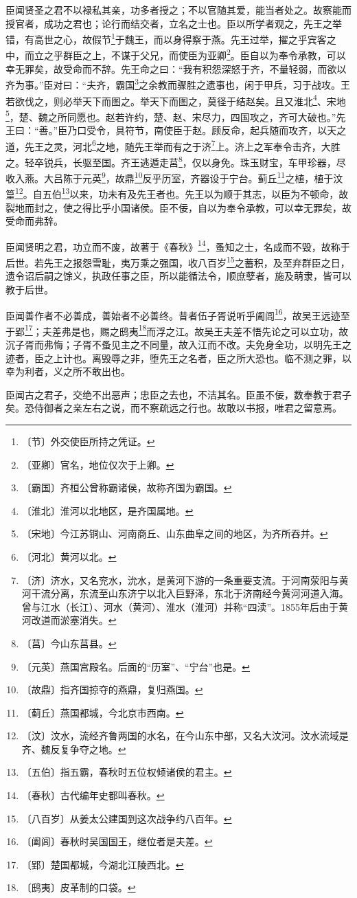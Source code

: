 \documentclass[12pt,UTF-8,openany,a4]{ctexbook}
\begin{document}
\begin{large}
    臣闻贤圣之君不以禄私其亲，功多者授之；不以官随其爱，能当者处之。故察能而授官者，成功之君也；论行而结交者，立名之士也。臣以所学者观之，先王之举错，有高世之心，故假节\footnote{〔节〕\yiwen 外交使臣所持之凭证。}于魏王，而以身得察于燕。先王过举，擢之乎宾客之中，而立之乎群臣之上，不谋于父兄，而使臣为亚卿\footnote{〔亚卿〕\yiwen 官名，地位仅次于上卿。}。臣自以为奉令承教，可以幸无罪矣，故受命而不辞。先王命之曰：“我有积怨深怒于齐，不量轻弱，而欲以齐为事。”臣对曰：“夫齐，霸国\footnote{〔霸国〕\yiwen 齐桓公曾称霸诸侯，故称齐国为霸国。}之余教而骤胜之遗事也，闲于甲兵，习于战攻。王若欲伐之，则必举天下而图之。举天下而图之，莫径于结赵矣。且又淮北\footnote{〔淮北〕\yiwen 淮河以北地区，是齐国属地。}、宋地\footnote{〔宋地〕\yiwen 今江苏铜山、河南商丘、山东曲阜之间的地区，为齐所吞并。}，楚、魏之所同愿也。赵若许约，楚、赵、宋尽力，四国攻之，齐可大破也。”先王曰：“善。”臣乃口受令，具符节，南使臣于赵。顾反命，起兵随而攻齐，以天之道，先王之灵，河北\footnote{〔河北〕\yiwen 黄河以北。}之地，随先王举而有之于济\footnote{〔济〕\yiwen 济水，又名兖水，沇水，是黄河下游的一条重要支流。于河南荥阳与黄河干流分离，东流至山东济宁以北入巨野泽，东北于济南经今黄河河道入海。曾与江水（长江）、河水（黄河）、淮水（淮河）并称“四渎”。1855年后由于黄河改道而淤塞消失。}上。济上之军奉令击齐，大胜之。轻卒锐兵，长驱至国。齐王逃遁走莒\footnote{〔莒〕\yiwen 今山东莒县。}，仅以身免。珠玉财宝，车甲珍器，尽收入燕。大吕陈于元英\footnote{〔元英〕\yiwen 燕国宫殿名。后面的“历室”、“宁台”也是。}，故鼎\footnote{〔故鼎〕\yiwen 指齐国掠夺的燕鼎，复归燕国。}反乎历室，齐器设于宁台。蓟丘\footnote{〔蓟丘〕\yiwen 燕国都城，今北京市西南。}之植，植于汶篁\footnote{〔汶〕\yiwen 汶水，流经齐鲁两国的水名，在今山东中部，又名大汶河。汶水流域是齐、魏反复争夺之地。}。自五伯\footnote{〔五伯〕\yiwen 指五霸，春秋时五位权倾诸侯的君主。}以来，功未有及先王者也。先王以为顺于其志，以臣为不顿命，故裂地而封之，使之得比乎小国诸侯。臣不佞，自以为奉令承教，可以幸无罪矣，故受命而弗辞。
    
    臣闻贤明之君，功立而不废，故著于《春秋》\footnote{〔春秋〕\yiwen 古代编年史都叫春秋。}，蚤知之士，名成而不毁，故称于后世。若先王之报怨雪耻，夷万乘之强国，收八百岁\footnote{〔八百岁〕\yiwen 从姜太公建国到这次战争约八百年。}之蓄积，及至弃群臣之日，遗令诏后嗣之馀义，执政任事之臣，所以能循法令，顺庶孽者，施及萌隶，皆可以教于后世。
    
    臣闻善作者不必善成，善始者不必善终。昔者伍子胥说听乎阖闾\footnote{〔阖闾〕\yiwen 春秋时吴国国王，继位者是夫差。}，故吴王远迹至于郢\footnote{〔郢〕\yiwen 楚国都城，今湖北江陵西北。}；夫差弗是也，赐之鸱夷\footnote{〔鸱夷〕\yiwen 皮革制的口袋。}而浮之江。故吴王夫差不悟先论之可以立功，故沉子胥而弗悔；子胥不蚤见主之不同量，故入江而不改。夫免身全功，以明先王之迹者，臣之上计也。离毁辱之非，堕先王之名者，臣之所大恐也。临不测之罪，以幸为利者，义之所不敢出也。
    
    臣闻古之君子，交绝不出恶声；忠臣之去也，不洁其名。臣虽不佞，数奉教于君子矣。恐侍御者之亲左右之说，而不察疏远之行也。故敢以书报，唯君之留意焉。
\end{large}
\end{document}
